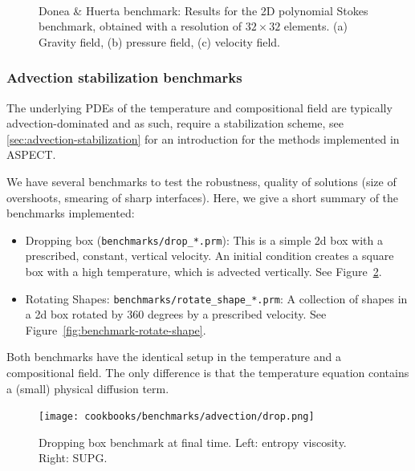 \documentclass{article}
\newcommand{\aspect}{\textsc{ASPECT}}
\begin{document}
\begin{figure}[t!]
  \centering
  ~ 
  ~
  \caption{Donea \& Huerta benchmark: Results for the 2D polynomial Stokes benchmark, 
obtained with a resolution of $32\times 32$ elements. (a) Gravity field, (b) pressure field,
(c) velocity field. }\label{fig:doneahuerta-benchmark}
\end{figure}


\subsubsection{Advection stabilization benchmarks}

The underlying PDEs of the temperature and compositional field are typically advection-dominated and as such, require a stabilization scheme, see \ref{sec:advection-stabilization} for
an introduction for the methods implemented in \aspect{}.

We have several benchmarks to test the robustness, quality of solutions (size of overshoots, smearing of sharp interfaces). Here, we give a short summary of the benchmarks implemented:
\begin{itemize}
 \item Dropping box (\texttt{benchmarks/drop\_*.prm}): This is a simple 2d box with a prescribed, constant, vertical velocity. An initial condition creates a square box with a high temperature, which is advected vertically. See Figure~\ref{fig:benchmark-drop}.

 \item Rotating Shapes: \texttt{benchmarks/rotate\_shape\_*.prm}: A collection of shapes in a 2d box
 rotated by 360 degrees by a prescribed velocity. See Figure~\ref{fig:benchmark-rotate-shape}.
\end{itemize}

Both benchmarks have the identical setup in the temperature and a compositional field. The only difference is that the temperature equation contains a (small) physical diffusion term.

\begin{figure}[t!]
  \centering
    \texttt{[image: cookbooks/benchmarks/advection/drop.png]}%
  \caption{Dropping box benchmark at final time. Left: entropy viscosity. Right: SUPG.}\label{fig:benchmark-drop}
\end{figure}
\end{document}
